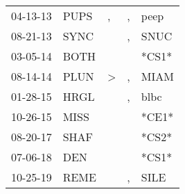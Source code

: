 \begin{supertabular}{p{0.07\textwidth}p{0.06\textwidth}p{0.02\textwidth}p{0.02\textwidth}p{0.06\textwidth}}
 04-13-13\textsuperscript{} &  PUPS\textsuperscript{} &             , &  , &           peep\textsuperscript{} \\
 08-21-13\textsuperscript{} &  SYNC\textsuperscript{} &               &  , &           SNUC\textsuperscript{} \\
 03-05-14\textsuperscript{} &  BOTH\textsuperscript{} &               &    &                            *CS1* \\
 08-14-14\textsuperscript{} &  PLUN\textsuperscript{} &  \textgreater &  , &           MIAM\textsuperscript{} \\
 01-28-15\textsuperscript{} &  HRGL\textsuperscript{} &               &  , &           blbc\textsuperscript{} \\
 10-26-15\textsuperscript{} &  MISS\textsuperscript{} &               &    &                            *CE1* \\
 08-20-17\textsuperscript{} &  SHAF\textsuperscript{} &               &    &                            *CS2* \\
 07-06-18\textsuperscript{} &   DEN\textsuperscript{} &               &    &                            *CS1* \\
 10-25-19\textsuperscript{} &  REME\textsuperscript{} &               &  , &           SILE\textsuperscript{} \\
\end{supertabular}
